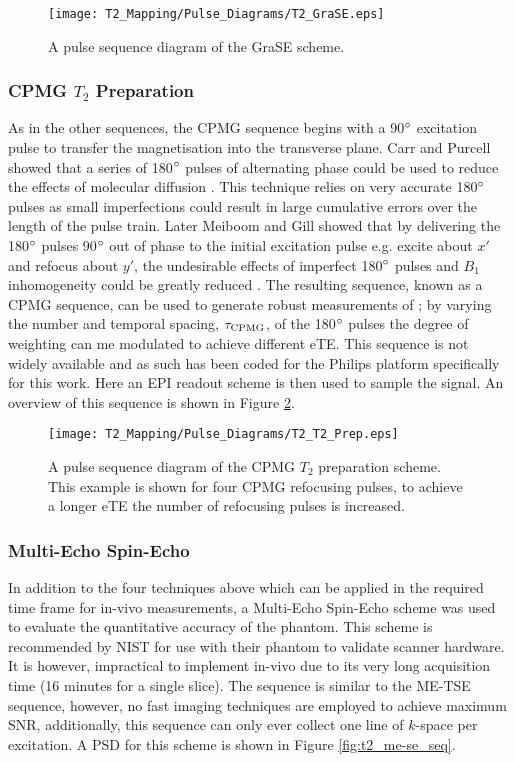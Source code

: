 \begin{figure}[H]
	\centering
	\texttt{[image: T2\_Mapping/Pulse\_Diagrams/T2\_GraSE.eps]}
	\caption{A pulse sequence diagram of the \ac{GraSE} scheme.}
	\label{fig:t2_grase_seq}	
\end{figure}

\newpage
\subsubsection{CPMG $T_2$ Preparation}

As in the other sequences, the \ac{CPMG} sequence begins with a 90$\degree$ excitation pulse to transfer the magnetisation into the transverse plane. Carr and Purcell showed that a series of 180$\degree$ pulses of alternating phase could be used to reduce the effects of molecular diffusion \cite{carr_effects_1954}. This technique relies on very accurate 180$\degree$ pulses as small imperfections could result in large cumulative errors over the length of the pulse train. Later Meiboom and Gill showed that by delivering the 180$\degree$ pulses 90$\degree$ out of phase to the initial excitation pulse e.g. excite about $x'$ and refocus about $y'$, the undesirable effects of imperfect 180$\degree$ pulses and $B_1$ inhomogeneity could be greatly reduced \cite{meiboom_modified_1958}. The resulting sequence, known as a \acf{CPMG} sequence, can be used to generate robust measurements of \ttwo; by varying the number and temporal spacing, $\tau_{\textup{CPMG}}$, of the 180$\degree$ pulses the degree of \ttwo weighting can me modulated to achieve different \ac{eTE}. This sequence is not widely available and as such has been coded for the Philips platform specifically for this work. Here an \ac{EPI} readout scheme is then used to sample the signal. An overview of this sequence is shown in Figure \ref{fig:t2_cpmg_t2prep_seq}.

\begin{figure}[H]
	\centering
	\texttt{[image: T2\_Mapping/Pulse\_Diagrams/T2\_T2\_Prep.eps]}
	\caption{A pulse sequence diagram of the \ac{CPMG} $T_2$ preparation scheme. This example is shown for four \ac{CPMG} refocusing pulses, to achieve a longer \ac{eTE} the number of refocusing pulses is increased.}
	\label{fig:t2_cpmg_t2prep_seq}	
\end{figure}

\subsubsection{Multi-Echo Spin-Echo}
In addition to the four techniques above which can be applied in the required time frame for in-vivo measurements, a Multi-Echo Spin-Echo scheme was used to evaluate the quantitative accuracy of the phantom. This scheme is recommended by \ac{NIST} for use with their phantom to validate scanner hardware. It is however, impractical to implement in-vivo due to its very long acquisition time (16 minutes for a single slice). The sequence is similar to the \ac{ME-TSE} sequence, however, no fast imaging techniques are employed to achieve maximum \ac{SNR}, additionally, this sequence can only ever collect one line of $k$-space per excitation. A \ac{PSD} for this scheme is shown in Figure \ref{fig:t2_me-se_seq}.

